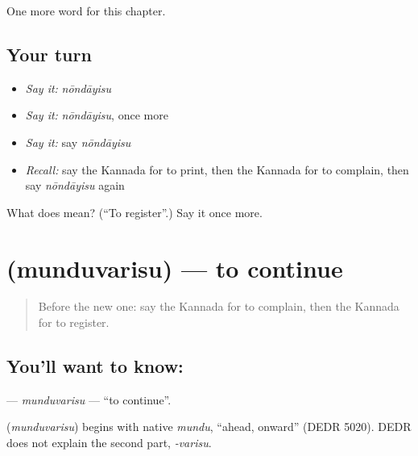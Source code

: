 \begin{grammarlens}[title={What you've built}]
One more word for this chapter.
\end{grammarlens}

\subsection*{Your turn}
\begin{itemize}
\raggedright
  \item \emph{Say it:} \emph{nōndāyisu}
  \item \emph{Say it:} \emph{nōndāyisu}, once more
  \item \emph{Say it:} say \emph{nōndāyisu}
  \item \emph{Recall:} say the Kannada for to print, then the Kannada for to complain, then say \emph{nōndāyisu} again
\end{itemize}

\begin{tcolorbox}[breakable,colback=teal!4,colframe=teal!35!black,title={Before you move on}]
What does  mean? (\textquotedblleft{}To register\textquotedblright{}.) Say it once more.
\end{tcolorbox}
\section[\texorpdfstring{\kn{ಮುಂದುವರಿಸು} (munduvarisu)}{ಮುಂದುವರಿಸು (munduvarisu)}]{ (munduvarisu) — to continue}

\label{lesson:KA-C202-munduvarisu}



\begin{quote}
Before the new one: say the Kannada for to complain, then the Kannada for to register.
\end{quote}

\subsection*{You'll want to know: }
\textbf{} — \emph{munduvarisu} — \textquotedblleft{}to continue\textquotedblright{}.

\begin{cousinweb}
\textbf{} (\emph{munduvarisu}) begins with native \emph{mundu}, \textquotedblleft{}ahead, onward\textquotedblright{} (DEDR 5020). DEDR does not explain the second part, \emph{-varisu}.
\end{cousinweb}

